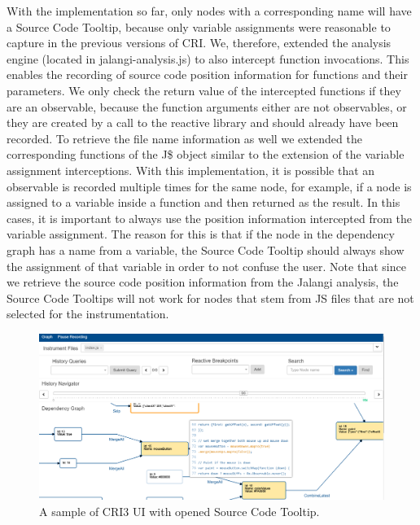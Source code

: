 With the implementation so far, only nodes with a corresponding name will have a Source Code Tooltip, because only variable assignments were reasonable to capture in the previous versions of CRI. We, therefore, extended the analysis engine (located in jalangi-analysis.js) to also intercept function invocations. This enables the recording of source code position information for functions and their parameters. We only check the return value of the intercepted functions if they are an observable, because the function arguments either are not observables, or they are created by a call to the reactive library and should already have been recorded. To retrieve the file name information as well we extended the corresponding functions of the J\$ object similar to the extension of the variable assignment interceptions. With this implementation, it is possible that an observable is recorded multiple times for the same node, for example, if a node is assigned to a variable inside a function and then returned as the result. In this cases, it is important to always use the position information intercepted from the variable assignment. The reason for this is that if the node in the dependency graph has a name from a variable, the Source Code Tooltip should always show the assignment of that variable in order to not confuse the user. Note that since we retrieve the source code position information from the Jalangi analysis, the Source Code Tooltips will not work for nodes that stem from JS files that are not selected for the instrumentation.\\

\begin{figure}[!h]
	\centering
	\includegraphics[scale=0.5,trim=0 0 0 0]{gfx/CRI-sampleView.png}
	\caption{A sample of CRI3 UI with opened Source Code Tooltip.}
	\label{fig:CRI}
\end{figure}

